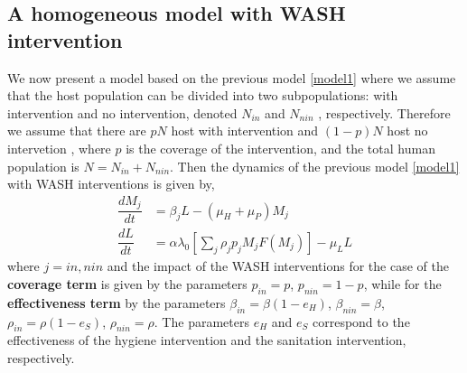 \documentclass[12pt,a4paper]{article}
\theoremstyle{plain}%
\theoremstyle{definition}
\theoremstyle{remark}
\begin{document}
	\subsection{A homogeneous model with WASH intervention}
	We now present a model based on the previous model \ref{model1} where we assume that the host population  can be divided into two subpopulations: with intervention and no intervention, denoted $N_{in}$  and $N_{nin}$ , respectively.
	Therefore we assume that there are $pN$  host  with intervention and  $(1-p)N$ host no intervetion , where $p$ is
	the coverage of the intervention, and the total human population is $N = N_{in}  + N_{nin}$.
	Then the dynamics of the previous model \ref{model1} with WASH interventions is given by,
	\begin{equation}\label{model1wash}
	\begin{split}
	\dfrac{dM_j}{dt}&=\beta_j L - (\mu_H+\mu_P) M_j\\%
	\dfrac{dL}{dt}&= \alpha \lambda_0 \left[ \sum_j \rho_j p_j M_j F(M_j)\right]   - \mu_L L 
	\end{split}
	\end{equation} 
	where $j=in,nin$ 
	and the impact of the WASH interventions for the case of the  \textbf{coverage term} is given by the parameters $p_{in}=p$, $p_{nin}=1-p$, while for the  \textbf{effectiveness term} by the parameters $\beta_{in}=\beta(1-e_H)$, $\beta_{nin}=\beta$, $\rho_{in}=\rho(1-e_S)$, $\rho_{nin}=\rho$.
	The parameters $e_H$ and $e_S$ correspond to the effectiveness of the hygiene intervention and the sanitation intervention, respectively.
	
\end{document}
